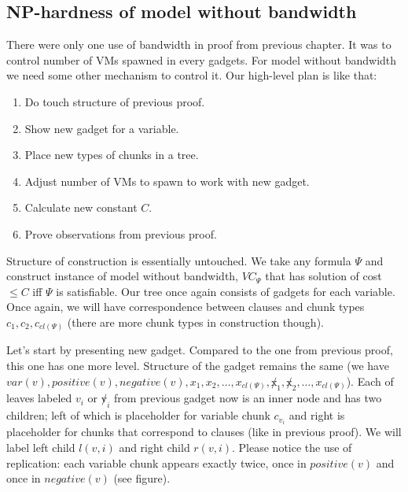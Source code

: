 \subsection{NP-hardness of model without bandwidth}

There were only one use of bandwidth in proof from previous
chapter. It was to control number of VMs spawned in every gadgets. For
model without bandwidth we need some other mechanism to control
it. Our high-level plan is like that:
\begin{enumerate}
\item Do touch structure of previous proof.
\item Show new gadget for a variable.
\item Place new types of chunks in a tree.
\item Adjust number of VMs to spawn to work with new gadget.
\item Calculate new constant $C$.
\item Prove observations from previous proof. 
\end{enumerate}

Structure of construction is essentially untouched. We take any
formula $\Psi$ and construct instance of model without bandwidth,
$VC_{\Psi}$ that has solution of cost $\leq C$ iff $\Psi$ is
satisfiable. Our tree once again consists of gadgets for each
variable. Once again, we will have correspondence between clauses and
chunk types $c_1, c_2, c_{cl(\Psi)}$ (there are more chunk types in
construction though).

Let's start by presenting new gadget. Compared to the one from
previous proof, this one has one more level. Structure of the gadget
remains the same (we have $var(v), positive(v), negative(v), x_1,
x_2, \ldots, x_{cl(\Psi)}, \not x_1, \not x_2, \ldots,
x_{cl(\Psi)}$). Each of leaves labeled $v_i$ or $\not v_i$ from previous gadget now is an inner
node and has two children; left of which is placeholder for variable chunk $c_{v_i}$ and
right is placeholder for chunks that correspond to clauses (like in
previous proof). We will label left child $l(v, i)$ and right child
$r(v, i)$. Please notice the use of replication: each variable
chunk appears exactly twice, once in $positive(v)$ and once in
$negative(v)$ (see figure).


